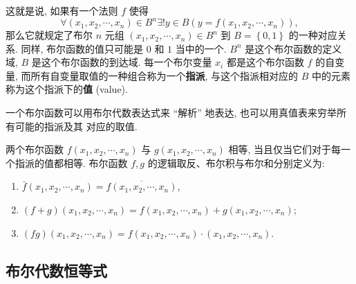 \documentclass[10pt,UTF8]{book} %
\begin{document}
这就是说,
如果有一个法则 $f$ 使得
\[ \forall (x_1, x_2, \cdots, x_n) \in B^n
\exists ! y \in B \left( y=f(x_1, x_2, \cdots, x_n) \right), \]
那么它就规定了布尔 $n$ 元组 $(x_1, x_2, \cdots, x_n) \in B^n$ 到 
$B = \left\{0,1\right\}$
的一种对应关系. 同样, 布尔函数的值只可能是 $0$ 和 $1$ 当中的一个.
$B^n$ 是这个布尔函数的定义域, $B$ 是这个布尔函数的到达域. 每一个布尔变量 $x_i$
都是这个布尔函数 $f$ 的自变量, 而所有自变量取值的一种组合称为一个\textbf{指派},
与这个指派相对应的 $B$ 中的元素称为这个指派下的\textbf{值} (value).

一个布尔函数可以用布尔代数表达式来 “解析” 地表达, 也可以用真值表来穷举所有可能的指派及其
对应的取值.

\begin{definition}
    两个布尔函数 $f(x_1, x_2, \cdots, x_n)$ 与 
    $g(x_1, x_2, \cdots, x_n)$ 相等, 当且仅当它们对于每一个指派的值都相等.
    布尔函数 $f,g$ 的逻辑取反、布尔积与布尔和分别定义为:
    \begin{enumerate}[label={${\arabic*}^\circ$}, itemsep=0pt]
        \item $\bar f(x_1, x_2, \cdots, x_n) = \overline{
            f(x_1, x_2, \cdots, x_n)
        }$,
        \item $(f+g)(x_1, x_2, \cdots, x_n)
        = f(x_1, x_2, \cdots, x_n) + g(x_1, x_2, \cdots, x_n)$;
        \item $(fg)(x_1, x_2, \cdots, x_n)
         = f(x_1, x_2, \cdots, x_n) \cdot (x_1, x_2, \cdots, x_n)$.
    \end{enumerate}
\end{definition}

\subsection{布尔代数恒等式}
\end{document}
